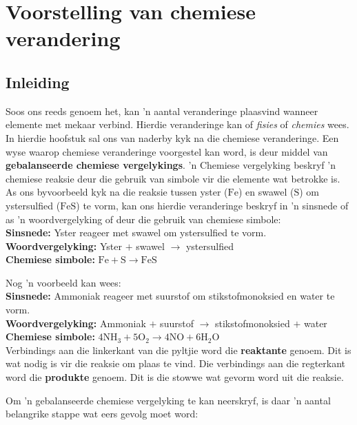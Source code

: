  \chapter{Voorstelling van che\-mie\-se ver\-an\-de\-ring}
    \label{337cc49099d6e82169c54b5d0fc3878f}
         \section{Inleiding}
    \nopagebreak

Soos ons reeds genoem het, kan 'n aantal veranderinge plaasvind wanneer elemente met mekaar verbind. Hierdie veranderinge kan of \textsl{fisies} of \textsl{chemies} wees. In hierdie hoofstuk sal ons van naderby kyk na die chemiese veranderinge. Een wyse waarop chemiese veranderinge voorgestel kan word, is deur middel van \textbf{gebalanseerde chemiese vergelykings}. 'n Chemiese vergelyking beskryf 'n chemiese reaksie deur die gebruik van simbole vir die elemente wat betrokke is. As ons byvoorbeeld kyk na die reaksie tussen yster ($\text{Fe}$) en swawel ($\text{S}$) om ystersulfied ($\text{FeS}$) te vorm, kan ons hierdie veranderinge beskryf in 'n sinsnede of as 'n woordvergelyking of deur die gebruik van chemiese simbole:\\
 \textbf{Sinsnede:} Yster reageer met swawel om ystersulfied te vorm.\\
 \textbf{Woordvergelyking:} Yster $+$ swawel $\to$ ystersulfied \\
 \textbf{Chemiese simbole:} $\text{Fe} + \text{S} \to \text{FeS}$\par
Nog 'n voorbeeld kan wees:\\
\textbf{Sinsnede:} Ammoniak reageer met suurstof om stikstofmonoksied en water te vorm.\\ 
\textbf{Woordvergelyking:} Ammoniak $+$ suurstof $\to$ stikstofmonoksied $+$ water\\
\textbf{Chemiese simbole:} $4{\text{NH}}_{3} + 5{\text{O}}_{2} \to 4\text{NO} + 6{\text{H}}_{2}\text{O}$\\
Verbindings aan die linkerkant van die pyltjie word die \textbf{reaktante} genoem. Dit is wat nodig is vir die
reaksie om plaas te vind. Die verbindings aan die regterkant word die \textbf{produkte} genoem. Dit is die stowwe wat gevorm word uit die reaksie.\par 
Om 'n gebalanseerde chemiese vergelyking te kan neerskryf, is daar 'n aantal belangrike stappe
wat eers gevolg moet word: 

